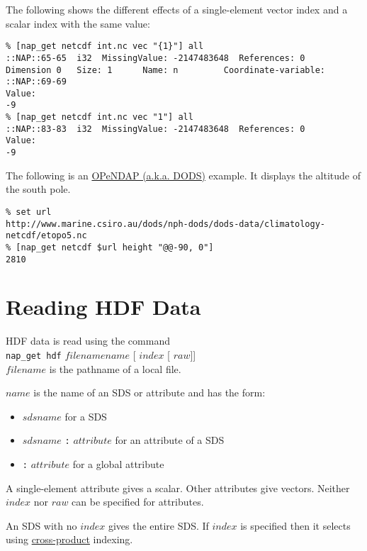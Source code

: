   

The following shows the different effects of a single-element
  vector index and a scalar index with the same value:
  \begin{verbatim}
% [nap_get netcdf int.nc vec "{1}"] all
::NAP::65-65  i32  MissingValue: -2147483648  References: 0
Dimension 0   Size: 1      Name: n         Coordinate-variable:
::NAP::69-69
Value:
-9
% [nap_get netcdf int.nc vec "1"] all
::NAP::83-83  i32  MissingValue: -2147483648  References: 0
Value:
-9
\end{verbatim}

  

The following is an 
  \href{http://www.opendap.org/}{OPeNDAP (a.k.a. DODS)} example.
  It displays the altitude of the south pole.
  \begin{verbatim}
% set url
http://www.marine.csiro.au/dods/nph-dods/dods-data/climatology-netcdf/etopo5.nc
% [nap_get netcdf $url height "@@-90, 0"]
2810
\end{verbatim}

  \section{
    \label{Reading-HDF-Data}Reading HDF Data
  }

  

HDF data is read using the command
  \\
  \texttt{nap\_get hdf} 
  $filename name$ [
  $index$ [
  $raw$]]
  \\
  


  $filename$ is the pathname of a local file.
  


  $name$ is the name of an SDS or attribute and has the
  form:
  \begin{itemize}
    \item 
    $sdsname$ for a SDS
    \item 
    $sdsname$
    \texttt{:}
    $attribute$ for an attribute of a SDS
    \item 
    \texttt{:}
    $attribute$ for a global attribute
    \\
  \end{itemize}
  

A single-element attribute gives a scalar. Other attributes give
  vectors. Neither 
  $index$ nor 
  $raw$ can be specified for attributes.
  

An SDS with no 
  $index$ gives the entire SDS. If 
  $index$ is specified then it selects using 
  \href{indexing.html\#Cross-product-index}{cross-product}
  indexing.
  

